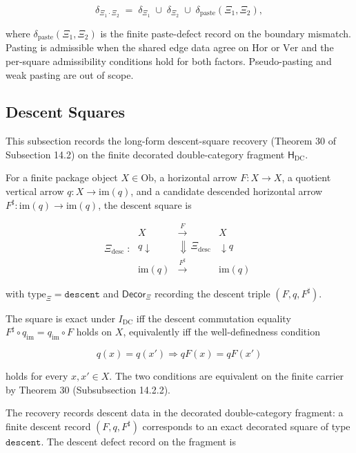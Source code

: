 \documentclass[11pt]{article}
\theoremstyle{definition}
\begin{document}
\[
\delta_{\Xi_{1}\cdot\Xi_{2}}\;=\;\delta_{\Xi_{1}}\;\cup\;\delta_{\Xi_{2}}\;\cup\;\delta_{\mathrm{paste}}(\Xi_{1},\Xi_{2}),
\]

where \(\delta_{\mathrm{paste}}(\Xi_{1},\Xi_{2})\) is the finite paste-defect record on the boundary mismatch. Pasting is admissible when the shared edge data agree on \(\mathrm{Hor}\) or \(\mathrm{Ver}\) and the per-square admissibility conditions hold for both factors. Pseudo-pasting and weak pasting are out of scope.

\subsection{Descent Squares}

This subsection records the long-form descent-square recovery (Theorem 30 of Subsection 14.2) on the finite decorated double-category fragment \(\mathsf H_{\mathrm{DC}}\).

For a finite package object \(X\in\mathrm{Ob}\), a horizontal arrow \(F:X\to X\), a quotient vertical arrow \(q:X\to\mathrm{im}(q)\), and a candidate descended horizontal arrow \(F^{\sharp}:\mathrm{im}(q)\to\mathrm{im}(q)\), the descent square is

\[
\Xi_{\mathrm{desc}}\;:\;
\begin{array}{ccc}
X & \xrightarrow{F} & X\\
{\scriptstyle q}\downarrow & \Downarrow\,\Xi_{\mathrm{desc}} & \downarrow{\scriptstyle q}\\
\mathrm{im}(q) & \xrightarrow{F^{\sharp}} & \mathrm{im}(q)
\end{array}
\]

with \(\mathrm{type}_{\Xi}=\texttt{descent}\) and \(\mathsf{Decor}_{\Xi}\) recording the descent triple \((F,q,F^{\sharp})\).

The square is exact under \(I_{\mathrm{DC}}\) iff the descent commutation equality \(F^{\sharp}\circ q_{\mathrm{im}}=q_{\mathrm{im}}\circ F\) holds on \(X\), equivalently iff the well-definedness condition

\[
q(x)=q(x')\Rightarrow qF(x)=qF(x')
\]

holds for every \(x,x'\in X\). The two conditions are equivalent on the finite carrier by Theorem 30 (Subsubsection 14.2.2).

The recovery records descent data in the decorated double-category fragment: a finite descent record \((F,q,F^{\sharp})\) corresponds to an exact decorated square of type \(\texttt{descent}\). The descent defect record on the fragment is
\end{document}
